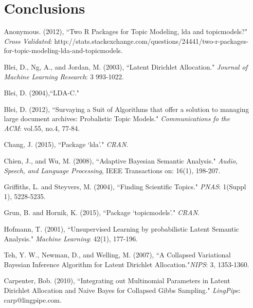\documentclass[3p,times]{elsarticle}
\begin{document}
\section{Conclusions}




\begin{thebibliography}{4}
	Anonymous. (2012),
	``Two R Packages for Topic Modeling, lda and topicmodels?" \textit{Cross Validated}: http://stats.stackexchange.com/questions/24441/two-r-packages-for-topic-modeling-lda-and-topicmodels.
	
	Blei, D., Ng, A., and Jordan, M.  (2003),
	``Latent Dirichlet Allocation."
	\textit{Journal of Machine Learning Research}: 3 993-1022.
	
	Blei, D. (2004),``LDA-C."
	
	Blei, D.  (2012),
	``Survaying a Suit of Algorithms that offer a solution to managing large document archives:          Probalistic Topic Models." \textit{Communications fo the ACM}: vol.55, no.4, 77-84.
	
	Chang, J.  (2015),
	``Package `lda'."
	\textit{CRAN}.
	
	Chien, J., and Wu, M.  (2008),
	``Adaptive Bayesian Semantic Analysis."
	\textit{Audio, Speech, and Language Processing}, IEEE Transactions on: 16(1), 198-207.
	
	Griffiths, L. and Steyvers, M.  (2004),
	``Finding Scientific Topics."
	\textit{PNAS}: 1(Suppl 1), 5228-5235.
	
	Grun, B. and Hornik, K.  (2015),
	``Package `topicmodels'."
	\textit{CRAN}.
	
	Hofmann, T.  (2001),
	``Unsupervised Learning by probabilistic Latent Semantic Analysis."
	\textit{Machine Learning}: 42(1), 177-196.
	
	Teh, Y. W., Newman, D., and Welling, M.  (2007),
	``A Collapsed Variational Bayesian Inference Algorithm for Latent Dirichlet 
	Allocation."\textit{NIPS}: 3, 1353-1360.
	
	Carpenter, Bob. (2010),
	``Integrating out Multinomial Parameters in Latent Dirichlet Allocation and Naive       Bayes for Collapsed Gibbs Sampling."
	\textit{LingPipe}: carp@lingpipe.com.
	
\end{thebibliography}
\end{document}
